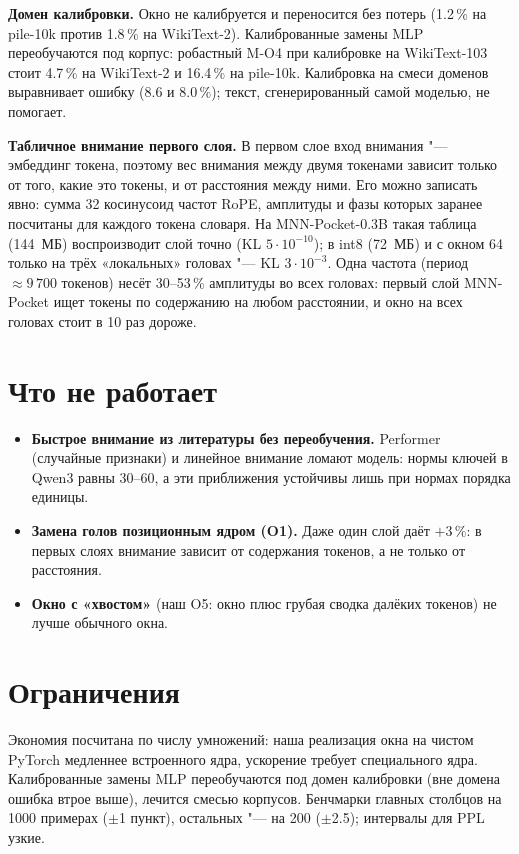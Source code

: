 \documentclass[10pt,a4paper]{article}
\begin{document}
\textbf{Домен калибровки.} Окно не калибруется и переносится без потерь
(1.2\,\% на pile-10k против 1.8\,\% на WikiText-2). Калиброванные замены MLP
переобучаются под корпус: робастный M-O4 при калибровке на WikiText-103 стоит
4.7\,\% на WikiText-2 и 16.4\,\% на pile-10k. Калибровка на смеси доменов
выравнивает ошибку (8.6 и 8.0\,\%); текст, сгенерированный самой моделью,
не помогает.

\textbf{Табличное внимание первого слоя.} В первом слое вход внимания "--- эмбеддинг токена, поэтому
вес внимания между двумя токенами зависит только от того, какие это токены, и от расстояния между ними.
Его можно записать явно: сумма 32 косинусоид частот RoPE, амплитуды и фазы которых заранее посчитаны для
каждого токена словаря. На MNN-Pocket-0.3B такая таблица (144~МБ) воспроизводит слой точно (KL $5\cdot10^{-10}$);
в int8 (72~МБ) и с окном 64 только на трёх «локальных» головах "--- KL $3\cdot10^{-3}$. Одна частота (период
$\approx 9\,700$ токенов) несёт 30--53\,\% амплитуды во всех головах: первый слой MNN-Pocket ищет токены по
содержанию на любом расстоянии, и окно на всех головах стоит в 10 раз дороже.

\section*{Что не работает}
\begin{itemize}
  \item \textbf{Быстрое внимание из литературы без переобучения.} Performer
    (случайные признаки) и линейное внимание ломают модель: нормы ключей в Qwen3
    равны 30--60, а эти приближения устойчивы лишь при нормах порядка единицы.
  \item \textbf{Замена голов позиционным ядром (O1).} Даже один слой даёт $+3\,\%$:
    в первых слоях внимание зависит от содержания токенов, а не только от расстояния.
  \item \textbf{Окно с «хвостом»} (наш O5: окно плюс грубая сводка далёких токенов)
    не лучше обычного окна.
\end{itemize}

\section*{Ограничения}
Экономия посчитана по числу умножений: наша реализация окна на чистом PyTorch
медленнее встроенного ядра, ускорение требует специального ядра. Калиброванные
замены MLP переобучаются под домен калибровки (вне домена ошибка втрое выше),
лечится смесью корпусов. Бенчмарки главных столбцов на 1000 примерах
($\pm$1 пункт), остальных "--- на 200 ($\pm$2.5); интервалы для PPL узкие.
\end{document}
